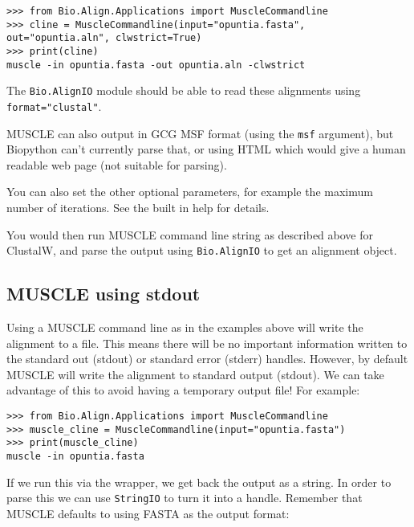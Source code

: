 \begin{verbatim}
>>> from Bio.Align.Applications import MuscleCommandline
>>> cline = MuscleCommandline(input="opuntia.fasta", out="opuntia.aln", clwstrict=True)
>>> print(cline)
muscle -in opuntia.fasta -out opuntia.aln -clwstrict
\end{verbatim}

\noindent The \verb|Bio.AlignIO| module should be able to read these alignments
using \texttt{format="clustal"}.

MUSCLE can also output in GCG MSF format (using the \texttt{msf} argument), but
Biopython can't currently parse that, or using HTML which would give a human
readable web page (not suitable for parsing).

You can also set the other optional parameters, for example the maximum number
of iterations. See the built in help for details.

You would then run MUSCLE command line string as described above for
ClustalW, and parse the output using \verb|Bio.AlignIO| to get an
alignment object.

\subsection{MUSCLE using stdout}

Using a MUSCLE command line as in the examples above will write the alignment
to a file. This means there will be no important information written to the
standard out (stdout) or standard error (stderr) handles. However, by default
MUSCLE will write the alignment to standard output (stdout). We can take
advantage of this to avoid having a temporary output file! For example:

\begin{verbatim}
>>> from Bio.Align.Applications import MuscleCommandline
>>> muscle_cline = MuscleCommandline(input="opuntia.fasta")
>>> print(muscle_cline)
muscle -in opuntia.fasta
\end{verbatim}

If we run this via the wrapper, we get back the output as a string. In order
to parse this we can use \verb|StringIO| to turn it into a handle.
Remember that MUSCLE defaults to using FASTA as the output format:

